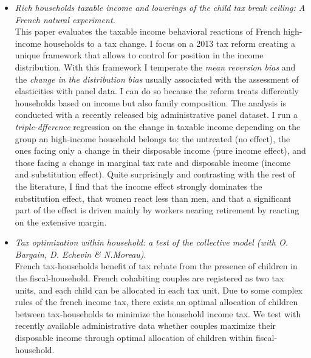 \documentclass[a4paper,11pt]{article} %
\begin{document}
\begin{itemize}
\item  {\emph{Rich households taxable income and lowerings of the child tax break ceiling: A French natural experiment.}} \\ 
 This paper evaluates the taxable income behavioral reactions of French high-income households to a tax change. I focus on a 2013 tax reform creating a unique framework that allows to control for  position in the income distribution. With this framework I temperate the \emph{mean reversion bias} and the  \emph{change in the distribution bias} usually associated with  the assessment of elasticities with panel data. I can do so because the reform treats differently households based on income but also family composition. The   analysis is conducted with a recently released big administrative panel dataset. I run a \emph{triple-dfference} regression on the  change in taxable income depending on the group an high-income household belongs to: the untreated (no effect), the ones facing only a change in their disposable  income (pure income effect), and those facing a change in marginal tax rate and disposable income (income and substitution effect). Quite surprisingly and contrasting with the rest of the literature, I find 
 that the income effect strongly dominates the substitution effect, that women react less than men, and that a significant part of the effect is driven mainly by workers nearing retirement by reacting on the extensive margin.

\item {\emph{Tax optimization within household: a test of the collective model (with O. Bargain, D. Echevin \& N.Moreau)}}.\\ French tax-households benefit of tax rebate from the presence of children in the fiscal-household. French cohabiting couples are registered as two tax units, and each child can be allocated in each tax unit. Due to some complex rules of the french income tax, there exists an optimal allocation of children between tax-households to minimize the household income tax. We test with recently available administrative data whether couples maximize their disposable income through optimal allocation of children within fiscal-household.
\end{itemize}
\end{document}
